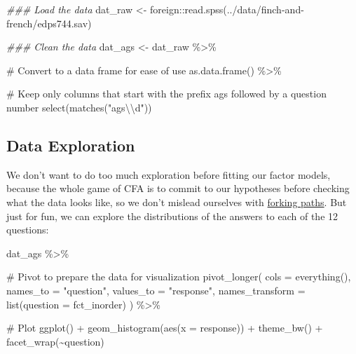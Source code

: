 \documentclass[
  letterpaper,
  DIV=11,
  numbers=noendperiod]{scrreprt}
\newenvironment{Shaded}{\begin{snugshade}}{\end{snugshade}}
\newcommand{\AttributeTok}[1]{\textcolor[rgb]{0.40,0.45,0.13}{#1}}
\newcommand{\CommentTok}[1]{\textcolor[rgb]{0.37,0.37,0.37}{#1}}
\newcommand{\DocumentationTok}[1]{\textcolor[rgb]{0.37,0.37,0.37}{\textit{#1}}}
\newcommand{\FunctionTok}[1]{\textcolor[rgb]{0.28,0.35,0.67}{#1}}
\newcommand{\NormalTok}[1]{\textcolor[rgb]{0.00,0.23,0.31}{#1}}
\newcommand{\OtherTok}[1]{\textcolor[rgb]{0.00,0.23,0.31}{#1}}
\newcommand{\SpecialCharTok}[1]{\textcolor[rgb]{0.37,0.37,0.37}{#1}}
\newcommand{\StringTok}[1]{\textcolor[rgb]{0.13,0.47,0.30}{#1}}
\begin{document}
\begin{Shaded}
\begin{Highlighting}[]
\DocumentationTok{\#\#\# Load the data}
\NormalTok{dat\_raw }\OtherTok{\textless{}{-}}\NormalTok{ foreign}\SpecialCharTok{::}\FunctionTok{read.spss}\NormalTok{(}\StringTok{\textquotesingle{}../data/finch{-}and{-}french/edps744.sav\textquotesingle{}}\NormalTok{) }
  
\DocumentationTok{\#\#\# Clean the data}
\NormalTok{dat\_ags }\OtherTok{\textless{}{-}}\NormalTok{ dat\_raw }\SpecialCharTok{\%\textgreater{}\%} 

  \CommentTok{\# Convert to a data frame for ease of use}
  \FunctionTok{as.data.frame}\NormalTok{() }\SpecialCharTok{\%\textgreater{}\%} 
  
  \CommentTok{\# Keep only columns that start with the prefix \textquotesingle{}ags\textquotesingle{} followed by a question number}
  \FunctionTok{select}\NormalTok{(}\FunctionTok{matches}\NormalTok{(}\StringTok{"ags}\SpecialCharTok{\textbackslash{}\textbackslash{}}\StringTok{d"}\NormalTok{)) }
\end{Highlighting}
\end{Shaded}

\hypertarget{data-exploration}{%
\subsection*{Data Exploration}\label{data-exploration}}

We don't want to do too much exploration before fitting our factor
models, because the whole game of CFA is to commit to our hypotheses
before checking what the data looks like, so we don't mislead ourselves
with
\href{http://www.stat.columbia.edu/~gelman/research/unpublished/p_hacking.pdf}{forking
paths}. But just for fun, we can explore the distributions of the
answers to each of the 12 questions:

\begin{Shaded}
\begin{Highlighting}[]
\NormalTok{dat\_ags }\SpecialCharTok{\%\textgreater{}\%} 

  \CommentTok{\# Pivot to prepare the data for visualization}
  \FunctionTok{pivot\_longer}\NormalTok{(}
    \AttributeTok{cols      =} \FunctionTok{everything}\NormalTok{(),}
    \AttributeTok{names\_to  =} \StringTok{"question"}\NormalTok{,}
    \AttributeTok{values\_to =} \StringTok{"response"}\NormalTok{,}
    \AttributeTok{names\_transform =} \FunctionTok{list}\NormalTok{(}\AttributeTok{question =}\NormalTok{ fct\_inorder)  }
\NormalTok{  ) }\SpecialCharTok{\%\textgreater{}\%} 

  \CommentTok{\# Plot}
  \FunctionTok{ggplot}\NormalTok{() }\SpecialCharTok{+}
  \FunctionTok{geom\_histogram}\NormalTok{(}\FunctionTok{aes}\NormalTok{(}\AttributeTok{x =}\NormalTok{ response)) }\SpecialCharTok{+} 
  \FunctionTok{theme\_bw}\NormalTok{() }\SpecialCharTok{+} 
  \FunctionTok{facet\_wrap}\NormalTok{(}\SpecialCharTok{\textasciitilde{}}\NormalTok{question)}
\end{Highlighting}
\end{Shaded}
\end{document}
